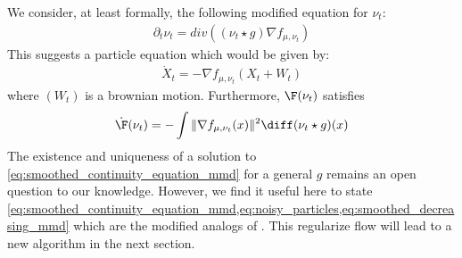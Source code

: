 We consider, at least formally, the following modified equation for $\nu_t$:
\begin{align}\label{eq:smoothed_continuity_equation_mmd}
	\partial_t \nu_t = div((\nu_t \star g) \nabla f_{\mu,\nu_t} )
\end{align}
This suggests a particle equation which would be given by:
\begin{align}\label{eq:noisy_particles}
	\dot{X}_t = -\nabla f_{\mu,\nu_t}( X_t + W_t  )
\end{align}
where $(W_t)$ is a brownian motion. Furthermore, $\F(\nu_t)$ satisfies
\begin{align}\label{eq:smoothed_decreasing_mmd}
	\dot{\F}(\nu_t) = -\int \Vert \nabla f_{\mu,\nu_t}(x)\Vert^2 \diff (\nu_t\star g)(x)
\end{align}
The existence and uniqueness of a solution to \cref{eq:smoothed_continuity_equation_mmd} for a general $g$ remains an open question to our knowledge. However, we find it useful here to state \cref{eq:smoothed_continuity_equation_mmd,eq:noisy_particles,eq:smoothed_decreasing_mmd} which are the modified analogs of . This regularize flow will lead to a new algorithm in the next section.